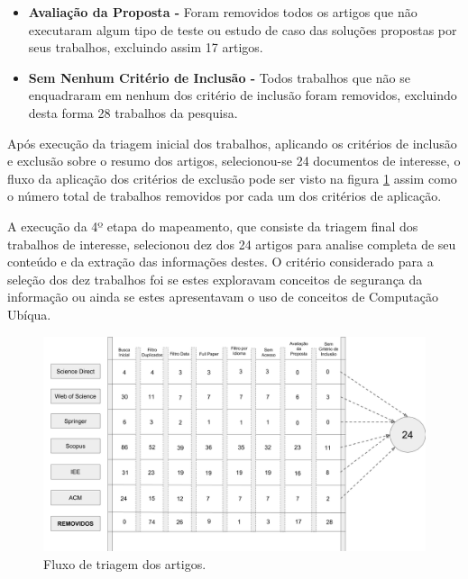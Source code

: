\documentclass[tid,table]{texufpel} %
\begin{document}
\begin{itemize}
	\item  \textbf{Avaliação da Proposta - } Foram removidos todos os artigos que não executaram algum tipo de teste ou estudo de caso das soluções propostas por seus trabalhos, excluindo assim 17 artigos.
	
	\item  \textbf{Sem Nenhum Critério de Inclusão - } Todos trabalhos que não  se enquadraram em nenhum dos critério de inclusão foram removidos, excluindo desta forma 28 trabalhos da pesquisa.	

\end{itemize}


Após execução da triagem inicial dos trabalhos, aplicando os critérios de inclusão e exclusão sobre o resumo dos artigos, selecionou-se 24 documentos de interesse, o fluxo da aplicação dos critérios de exclusão pode ser visto na figura \ref{fig:grafFluxoTriagemInicial} assim como o número total de trabalhos removidos por cada um dos critérios de aplicação. 

A execução da 4º etapa do mapeamento, que consiste da triagem final dos trabalhos de interesse, selecionou dez dos 24 artigos para analise completa de seu conteúdo e da extração das informações destes. O critério considerado para a seleção dos dez trabalhos foi se estes exploravam conceitos de segurança da informação ou ainda se estes apresentavam o uso de conceitos de Computação Ubíqua. 


\begin{landscape}
\begin{figure}[ht]
	\centering
	\includegraphics[width=1.7\textwidth]{imagens/FluxoTriagemInicial.png}
	\caption{Fluxo de triagem dos artigos.}
	\label{fig:grafFluxoTriagemInicial}
\end{figure}
\end{landscape}
\end{document}
